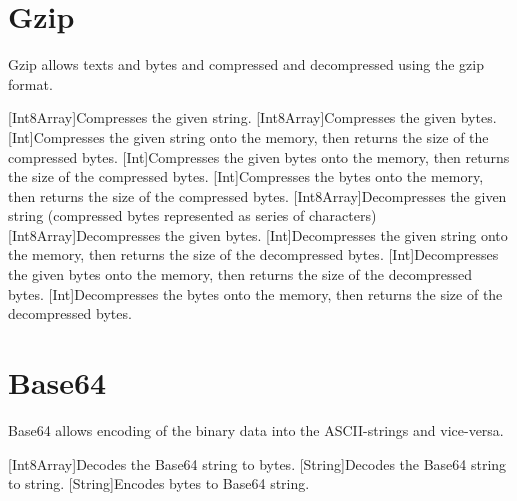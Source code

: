 \section{Gzip}

Gzip allows texts and bytes and compressed and decompressed using the gzip format.


\begin{outline}
\1[Int8Array]{Compresses the given string.}
\1[Int8Array]{Compresses the given bytes.}
\1[Int]{Compresses the given string onto the memory, then returns the size of the compressed bytes.}
\1[Int]{Compresses the given bytes onto the memory, then returns the size of the compressed bytes.}
\1[Int]{Compresses the bytes onto the memory, then returns the size of the compressed bytes.}
\1[Int8Array]{Decompresses the given string (compressed bytes represented as series of characters)}
\1[Int8Array]{Decompresses the given bytes.}
\1[Int]{Decompresses the given string onto the memory, then returns the size of the decompressed bytes.}
\1[Int]{Decompresses the given bytes onto the memory, then returns the size of the decompressed bytes.}
\1[Int]{Decompresses the bytes onto the memory, then returns the size of the decompressed bytes.}
\end{outline}



\section{Base64}

Base64 allows encoding of the binary data into the ASCII-strings and vice-versa.


\begin{outline}
\1[Int8Array]{Decodes the Base64 string to bytes.}
\1[String]{Decodes the Base64 string to string.}
\1[String]{Encodes bytes to Base64 string.}
\end{outline}



